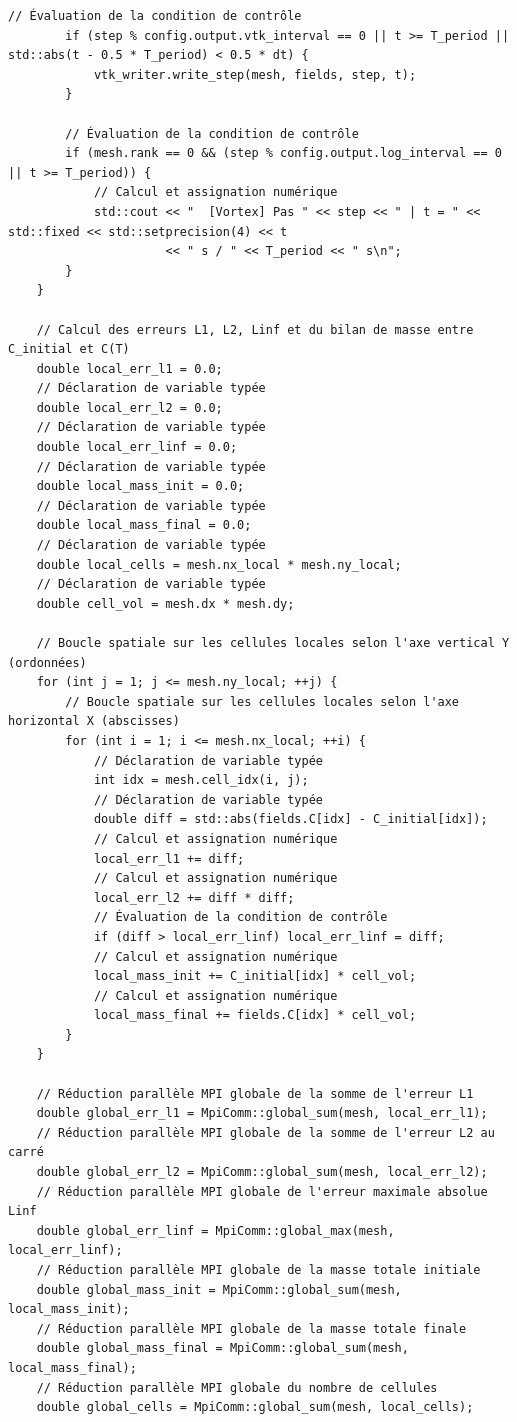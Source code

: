 \documentclass[10pt,a4paper,oneside]{book}
\begin{document}
\begin{lstlisting}[language={[11]C++}]
        // Évaluation de la condition de contrôle
        if (step % config.output.vtk_interval == 0 || t >= T_period || std::abs(t - 0.5 * T_period) < 0.5 * dt) {
            vtk_writer.write_step(mesh, fields, step, t);
        }

        // Évaluation de la condition de contrôle
        if (mesh.rank == 0 && (step % config.output.log_interval == 0 || t >= T_period)) {
            // Calcul et assignation numérique
            std::cout << "  [Vortex] Pas " << step << " | t = " << std::fixed << std::setprecision(4) << t
                      << " s / " << T_period << " s\n";
        }
    }

    // Calcul des erreurs L1, L2, Linf et du bilan de masse entre C_initial et C(T)
    double local_err_l1 = 0.0;
    // Déclaration de variable typée
    double local_err_l2 = 0.0;
    // Déclaration de variable typée
    double local_err_linf = 0.0;
    // Déclaration de variable typée
    double local_mass_init = 0.0;
    // Déclaration de variable typée
    double local_mass_final = 0.0;
    // Déclaration de variable typée
    double local_cells = mesh.nx_local * mesh.ny_local;
    // Déclaration de variable typée
    double cell_vol = mesh.dx * mesh.dy;

    // Boucle spatiale sur les cellules locales selon l'axe vertical Y (ordonnées)
    for (int j = 1; j <= mesh.ny_local; ++j) {
        // Boucle spatiale sur les cellules locales selon l'axe horizontal X (abscisses)
        for (int i = 1; i <= mesh.nx_local; ++i) {
            // Déclaration de variable typée
            int idx = mesh.cell_idx(i, j);
            // Déclaration de variable typée
            double diff = std::abs(fields.C[idx] - C_initial[idx]);
            // Calcul et assignation numérique
            local_err_l1 += diff;
            // Calcul et assignation numérique
            local_err_l2 += diff * diff;
            // Évaluation de la condition de contrôle
            if (diff > local_err_linf) local_err_linf = diff;
            // Calcul et assignation numérique
            local_mass_init += C_initial[idx] * cell_vol;
            // Calcul et assignation numérique
            local_mass_final += fields.C[idx] * cell_vol;
        }
    }

    // Réduction parallèle MPI globale de la somme de l'erreur L1
    double global_err_l1 = MpiComm::global_sum(mesh, local_err_l1);
    // Réduction parallèle MPI globale de la somme de l'erreur L2 au carré
    double global_err_l2 = MpiComm::global_sum(mesh, local_err_l2);
    // Réduction parallèle MPI globale de l'erreur maximale absolue Linf
    double global_err_linf = MpiComm::global_max(mesh, local_err_linf);
    // Réduction parallèle MPI globale de la masse totale initiale
    double global_mass_init = MpiComm::global_sum(mesh, local_mass_init);
    // Réduction parallèle MPI globale de la masse totale finale
    double global_mass_final = MpiComm::global_sum(mesh, local_mass_final);
    // Réduction parallèle MPI globale du nombre de cellules
    double global_cells = MpiComm::global_sum(mesh, local_cells);


\end{lstlisting}
\end{document}
